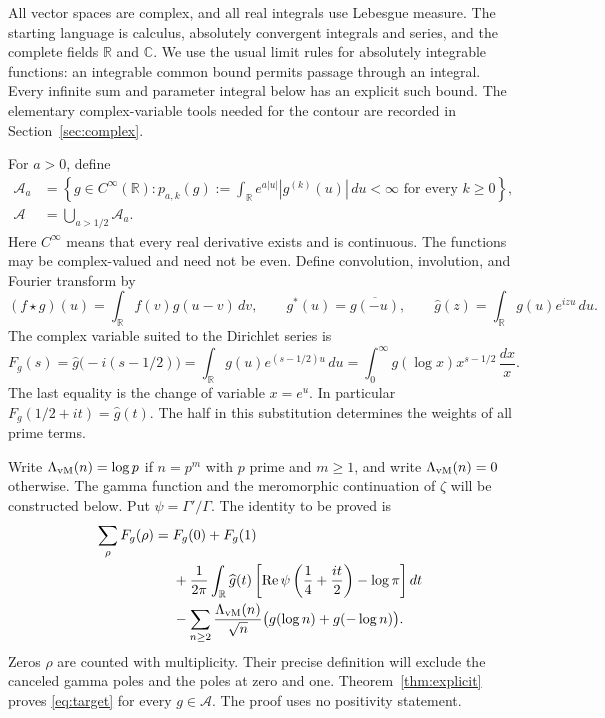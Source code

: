 \documentclass[11pt]{article}
\numberwithin{equation}{section}
\newcommand{\R}{\mathbb R}
\newcommand{\C}{\mathbb C}
\newcommand{\A}{\mathcal A}
\begin{document}
All vector spaces are complex, and all real integrals use Lebesgue measure.
The starting language is calculus, absolutely convergent integrals and
series, and the complete fields $\R$ and $\C$.
We use the usual limit rules for absolutely integrable functions: an
integrable common bound permits passage through an integral.
Every infinite sum and parameter integral below has an explicit such bound.
The elementary complex-variable tools needed for the contour are recorded
in Section~\ref{sec:complex}.

For $a>0$, define
\begin{equation}
 \begin{aligned}
 \A_a&=\left\{g\in C^\infty(\R):
   p_{a,k}(g):=\int_{\R}e^{a|u|}|g^{(k)}(u)|\,du<\infty
                     \text{ for every }k\geq0\right\},\\
 \A&=\bigcup_{a>1/2}\A_a.
 \end{aligned}
 \label{eq:test-class}
\end{equation}
Here $C^\infty$ means that every real derivative exists and is continuous.
The functions may be complex-valued and need not be even.
Define convolution, involution, and Fourier transform by
\begin{equation}
 (f\star g)(u)=\int_{\R}f(v)g(u-v)\,dv,
 \qquad g^*(u)=\overline{g(-u)},
 \qquad \widehat g(z)=\int_{\R}g(u)e^{izu}\,du.
 \label{eq:operations}
\end{equation}
The complex variable suited to the Dirichlet series is
\begin{equation}
 F_g(s)=\widehat g\bigl(-i(s-1/2)\bigr)
       =\int_{\R}g(u)e^{(s-1/2)u}\,du
       =\int_0^\infty g(\log x)x^{s-1/2}\,\frac{dx}{x}.
 \label{eq:centered-mellin}
\end{equation}
The last equality is the change of variable $x=e^u$.
In particular $F_g(1/2+it)=\widehat g(t)$.
The half in this substitution determines the weights of all prime terms.

Write $\Lambda_{\rm vM}(n)=\log p$ if $n=p^m$ with $p$ prime and $m\geq1$,
and write $\Lambda_{\rm vM}(n)=0$ otherwise.
The gamma function and the meromorphic continuation of $\zeta$ will be
constructed below.  Put $\psi=\Gamma'/\Gamma$.
The identity to be proved is
\begin{equation}
\begin{split}
 \sum_\rho F_g(\rho)={}&F_g(0)+F_g(1)\\
 &+\frac1{2\pi}\int_{\R}\widehat g(t)
 \left[\operatorname{Re}\psi\left(\frac14+\frac{it}{2}\right)-\log\pi\right]dt\\
 &-\sum_{n\geq2}\frac{\Lambda_{\rm vM}(n)}{\sqrt n}
                      \bigl(g(\log n)+g(-\log n)\bigr).
\end{split}
\label{eq:target}
\end{equation}
Zeros $\rho$ are counted with multiplicity.  Their precise definition will
exclude the canceled gamma poles and the poles at zero and one.
Theorem~\ref{thm:explicit} proves \eqref{eq:target} for every $g\in\A$.
The proof uses no positivity statement.
\end{document}
